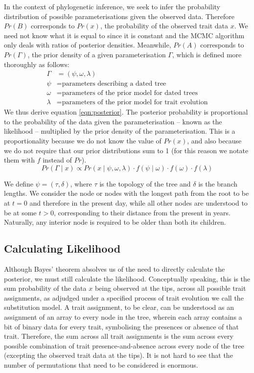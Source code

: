 \documentclass[10pt,journal,compsoc]{IEEEtran}
\begin{document}
In the context of phylogenetic inference, we seek to infer the probability distribution of possible parameterisations given the observed data. Therefore $Pr(B)$ corresponds to $Pr(x)$, the probability of the observed trait data $x$. We need not know what it is equal to since it is constant and the MCMC algorithm only deals with ratios of posterior densities. Meanwhile, $Pr(A)$ corresponds to $Pr(\Gamma)$, the prior density of a given parameterisation $\Gamma$, which is defined more thoroughly as follows:
\begin{align*}
    \Gamma &= (\psi, \omega, \lambda)\\
    \psi   &= \text{parameters describing a dated tree}\\
    \omega &= \text{parameters of the prior model for dated trees}\\
    \lambda&= \text{parameters of the prior model for trait evolution}
\end{align*}
We thus derive equation \eqref{eqn:posterior}. The posterior probability is proportional to the probability of the data given the parameterisation -- known as the likelihood -- multiplied by the prior density of the parameterisation. This is a proportionality because we do not know the value of $Pr(x)$, and also because we do not require that our prior distributions sum to 1 (for this reason we notate them with $f$ instead of $Pr$).
\begin{equation}\label{eqn:posterior}
    Pr(\Gamma\;|\; x) \propto Pr(x\;|\;\psi, \omega, \lambda) \cdot f(\psi\;|\;\omega) \cdot f(\omega) \cdot f(\lambda)
\end{equation}

We define $\psi = (\tau, \delta)$, where $\tau$ is the topology of the tree and $\delta$ is the branch lengths. We consider the node or nodes with the longest path from the root to be at $t = 0$ and therefore in the present day, while all other nodes are understood to be at some $t > 0$, corresponding to their distance from the present in years. Naturally, any interior node is required to be older than both its children.

\subsection{Calculating Likelihood}

Although Bayes' theorem absolves us of the need to directly calculate the posterior, we must still calculate the likelihood. Conceptually speaking, this is the sum probability of the data $x$ being observed at the tips, across all possible trait assignments, as adjudged under a specified process of trait evolution we call the substitution model. A trait assignment, to be clear, can be understood as an assignment of an array to every node in the tree, wherein each array contains a bit of binary data for every trait, symbolising the presences or absence of that trait. Therefore, the sum across all trait assignments is the sum across every possible combination of trait presence-and-absence across every node of the tree (excepting the observed trait data at the tips). It is not hard to see that the number of permutations that need to be considered is enormous.
\end{document}
